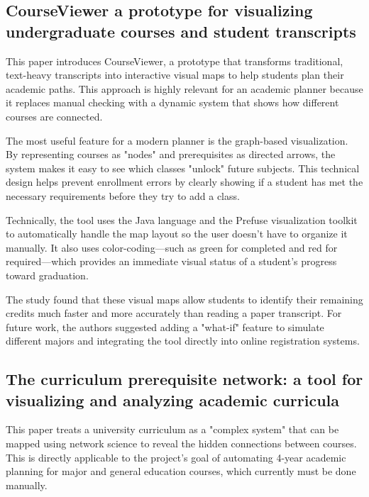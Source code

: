 
\subsection{CourseViewer a prototype for visualizing undergraduate courses and student transcripts \cite {paper_15}}

This paper introduces CourseViewer, a prototype that transforms traditional, text-heavy transcripts into interactive visual maps to help students plan their academic paths. This approach is highly relevant for an academic planner because it replaces manual checking with a dynamic system that shows how different courses are connected.

The most useful feature for a modern planner is the graph-based visualization. By representing courses as "nodes" and prerequisites as directed arrows, the system makes it easy to see which classes "unlock" future subjects. This technical design helps prevent enrollment errors by clearly showing if a student has met the necessary requirements before they try to add a class.

Technically, the tool uses the Java language and the Prefuse visualization toolkit to automatically handle the map layout so the user doesn't have to organize it manually. It also uses color-coding—such as green for completed and red for required—which provides an immediate visual status of a student's progress toward graduation.

The study found that these visual maps allow students to identify their remaining credits much faster and more accurately than reading a paper transcript. For future work, the authors suggested adding a "what-if" feature to simulate different majors and integrating the tool directly into online registration systems.


\subsection{The curriculum prerequisite network: a tool for visualizing and analyzing academic curricula \cite{paper_13}}

This paper treats a university curriculum as a "complex system" that can be mapped using network science to reveal the hidden connections between courses. This is directly applicable to the project’s goal of automating 4-year academic planning for major and general education courses, which currently must be done manually.

